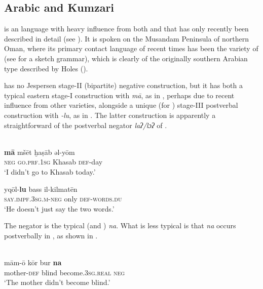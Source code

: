 \documentclass[output=paper]{langsci/langscibook}
\begin{document}
\subsection{Arabic and Kumzari}\label{sec:key:kumz}


 is an  language with heavy influence from both  and  that has only recently been described in detail (see \citealt{WalAnonbyforthcoming}). It is spoken on the Musandam Peninsula of northern Oman, where its primary contact language of recent times has been the  variety of  (see \citealt{Bernabela2011} for a sketch grammar), which is clearly of the originally southern Arabian type described by Holes (\citeyear[18–32]{Holes2016}).

  has no Jespersen stage-II (bipartite) negative construction, but it has both a typical eastern  stage-I construction with \textit{mā}, as in , perhaps due to recent influence from other   varieties, alongside a unique (for ) stage-III postverbal construction with \textit{{}-lu}, as in . The latter construction is apparently a straightforward  of the postverbal negator \textit{laʔ/lɔʔ} of  .


\ea
{  \citep[87]{Bernabela2011}}\\
\ea\gll \textbf{mā} mšēt ḫaṣāb əl-yōm\label{shi.a}\\
     \textsc{neg} \textsc{\textup{go.}}\textsc{prf.1sg} Khasab \textsc{def-}day  \\
\glt ‘I didn’t go to Khasab today.’

\ex\gll yqōl-\textbf{lu} bass il-kilmatēn\label{shi.b}\\
     \textsc{\textup{say.}}\textsc{impf.3sg.m-}\textsc{neg} only \textsc{def-}\textsc{\textup{words.}}\textsc{du}\\
\glt ‘He doesn’t just say the two words.’
\z
\z

The  negator is the typical  (and ) \textit{na}. What is less typical is that \textit{na} occurs postverbally in , as shown in .

\ea\label{kum}
{        \citep[211]{WalAnonbyforthcoming}}\\
\gll mām-ō kōr bur \textbf{na}\\
     mother\textsc{{}-def} blind become.3\textsc{sg.real} \textsc{neg} \\
\glt ‘The mother didn’t become blind.’
\z
\end{document}
